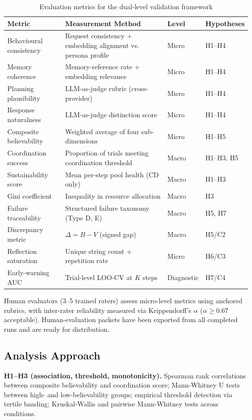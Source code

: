 \documentclass[11pt]{article}
\begin{document}
\begin{table}[h]
\centering
\caption{Evaluation metrics for the dual-level validation framework}
\label{tab:metrics}
\begin{tabular}{p{}p{}p{}p{}}
\toprule
Metric & Measurement Method & Level & Hypotheses \\
\midrule
Behavioural consistency & Request consistency + embedding alignment vs. persona profile & Micro & H1--H4 \\
Memory coherence & Memory-reference rate + embedding relevance & Micro & H1--H4 \\
Planning plausibility & LLM-as-judge rubric (cross-provider) & Micro & H1--H4 \\
Response naturalness & LLM-as-judge distinction score & Micro & H1--H4 \\
Composite believability & Weighted average of four sub-dimensions & Micro & H1--H5 \\
Coordination success & Proportion of trials meeting coordination threshold & Macro & H1--H3, H5 \\
Sustainability score & Mean per-step pool health (CD only) & Macro & H1--H3 \\
Gini coefficient & Inequality in resource allocation & Macro & H3 \\
Failure traceability & Structured failure taxonomy (Type D, E) & Macro & H5, H7 \\
Discrepancy metric & $\Delta = B - V$ (signed gap) & Macro & H5/C2 \\
Reflection saturation & Unique string count + repetition rate & Micro & H6/C3 \\
Early-warning AUC & Trial-level LOO-CV at $K$ steps & Diagnostic & H7/C4 \\
\bottomrule
\end{tabular}
\end{table}

Human evaluators (3--5 trained raters) assess micro-level metrics using anchored rubrics, with inter-rater reliability measured via Krippendorff's $\alpha$ ($\alpha \geq 0.67$ acceptable). Human-evaluation packets have been exported from all completed runs and are ready for distribution.

\subsection{Analysis Approach}

\textbf{H1--H3 (association, threshold, monotonicity).} Spearman rank correlations between composite believability and coordination score; Mann-Whitney U tests between high- and low-believability groups; empirical threshold detection via tertile banding; Kruskal-Wallis and pairwise Mann-Whitney tests across conditions.
\end{document}
